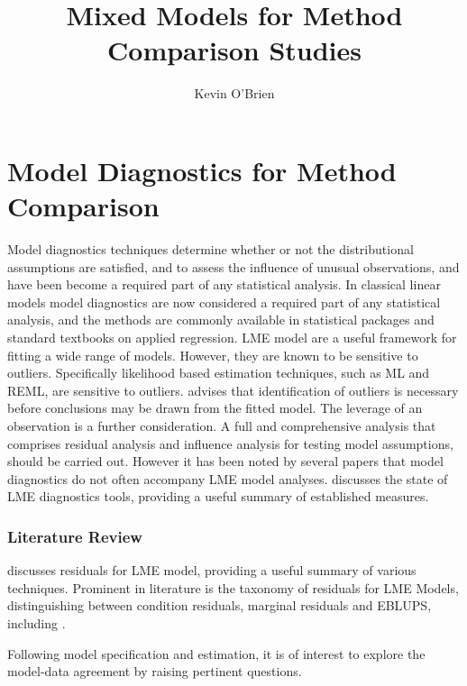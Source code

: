 \documentclass[12pt, a4paper]{report}
\author{ } \date{ }
\theoremstyle{definition}
\theoremstyle{remark}
\begin{document}
	\author{Kevin O'Brien}
	\title{Mixed Models for Method Comparison Studies}
	\tableofcontents
	


\newpage
	\chapter{Model Diagnostics for Method Comparison}
	
Model diagnostics techniques determine whether or not the distributional assumptions are satisfied, and to assess the influence of unusual observations, and have been become a required part of any statistical analysis. In classical linear models model diagnostics are now considered a required part of any statistical analysis, and the methods are commonly available in statistical packages and standard textbooks on applied regression. LME model are a useful framework for fitting a wide range of models. However, they are known to be sensitive to outliers. Specifically likelihood based estimation techniques, such as ML and REML, are sensitive to outliers. \citet{Christensen} advises that identification of outliers is necessary before conclusions may be drawn from the fitted model. The leverage of an observation is a further consideration. 
A full and comprehensive analysis that comprises residual analysis and influence analysis for testing model assumptions, should be carried out. However it has been noted by several papers \citep{Christensen, schabenberger} that model diagnostics do not often accompany LME model analyses. \citet{schabenberger} discusses the state of LME diagnostics tools, providing a useful summary of established measures.
	
\subsection*{Literature Review}	
\citet{schabenberger} discusses residuals for LME model, providing a useful summary of various techniques. Prominent in literature is the taxonomy of residuals for LME Models, distinguishing between condition residuals, marginal residuals and EBLUPS, including \citet{hilden1995, schabenberger, west, NobreSinger2007}.  

Following model specification and estimation, it is of interest to explore the model-data agreement by raising pertinent questions.  %
\end{document}

